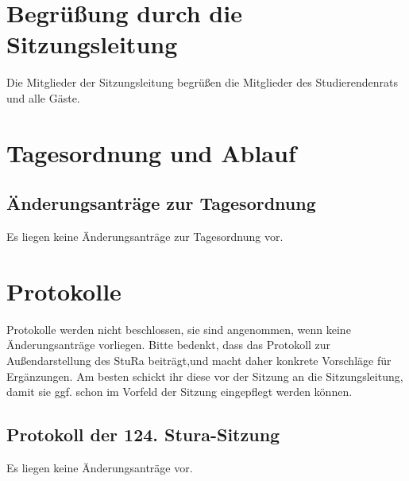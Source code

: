 \section{Begrüßung durch die Sitzungsleitung}
Die Mitglieder  der  Sitzungsleitung begrüßen die  Mitglieder  des  Studierendenrats  und  alle Gäste.

\section{Tagesordnung und Ablauf}
\hypersetup{linkcolor=black}%
\tableofcontents
\hypersetup{linkcolor=blue}%
\subsection{Änderungsanträge zur Tagesordnung}
Es liegen keine Änderungsanträge zur Tagesordnung vor.

\section{Protokolle}
Protokolle werden nicht beschlossen, sie sind angenommen, wenn keine Änderungsanträge vorliegen.
Bitte bedenkt, dass das Protokoll zur Außendarstellung des StuRa beiträgt,und macht daher konkrete Vorschläge
für Ergänzungen. Am besten schickt ihr diese vor der Sitzung an die Sitzungsleitung, damit sie ggf. schon im 
Vorfeld der Sitzung eingepflegt werden können.
\subsection{Protokoll der 124. Stura-Sitzung}
Es liegen keine Änderungsanträge vor.